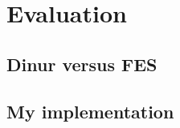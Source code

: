 \section{Evaluation} \label{sec:eval}
\subsection{Dinur versus FES}

\subsection{My implementation}
% 

\newpage